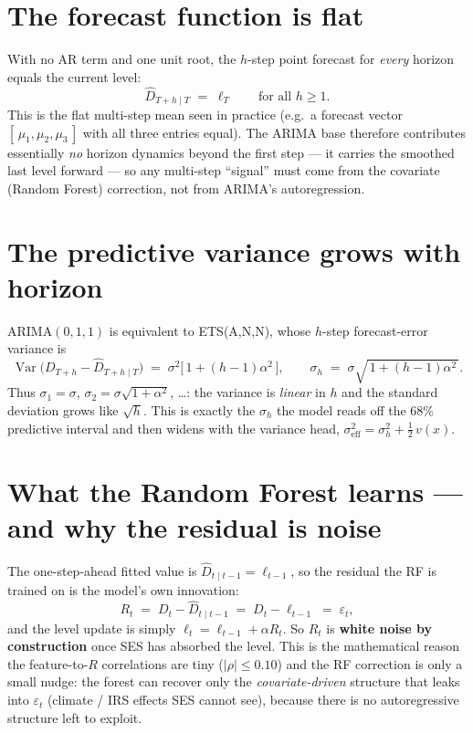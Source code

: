 \documentclass[11pt]{article}
\newcommand{\Var}{\operatorname{Var}}
\begin{document}
\section{The forecast function is flat}
With no AR term and one unit root, the $h$-step point forecast for \emph{every} horizon equals
the current level:
\begin{equation}
\hat D_{T+h\mid T} \;=\; \ell_T \qquad\text{for all } h\ge 1.
\label{eq:flat}
\end{equation}
This is the flat multi-step mean seen in practice (e.g.\ a forecast vector
$[\,\mu_1,\mu_2,\mu_3\,]$ with all three entries equal). The ARIMA base therefore contributes
essentially \emph{no} horizon dynamics beyond the first step --- it carries the smoothed last
level forward --- so any multi-step ``signal'' must come from the covariate (Random Forest)
correction, not from ARIMA's autoregression.

\section{The predictive variance grows with horizon}
ARIMA$(0,1,1)$ is equivalent to ETS(A,N,N), whose $h$-step forecast-error variance is
\begin{equation}
\Var\!\big(D_{T+h}-\hat D_{T+h\mid T}\big) \;=\; \sigma^2\big[\,1+(h-1)\alpha^2\,\big],
\qquad
\sigma_h \;=\; \sigma\sqrt{\,1+(h-1)\alpha^2\,}.
\label{eq:var}
\end{equation}
Thus $\sigma_1=\sigma$, $\sigma_2=\sigma\sqrt{1+\alpha^2}$, \dots: the variance is \emph{linear}
in $h$ and the standard deviation grows like $\sqrt{h}$. This is exactly the $\sigma_h$ the
model reads off the $68\%$ predictive interval and then widens with the variance head,
$\sigma_{\text{eff}}^2=\sigma_h^2+\tfrac12\,v(x)$.

\section{What the Random Forest learns --- and why the residual is noise}
The one-step-ahead fitted value is $\hat D_{t\mid t-1}=\ell_{t-1}$, so the residual the RF is
trained on is the model's own innovation:
\begin{equation}
R_t \;=\; D_t-\hat D_{t\mid t-1} \;=\; D_t-\ell_{t-1} \;=\; \varepsilon_t,
\label{eq:resid}
\end{equation}
and the level update is simply $\ell_t=\ell_{t-1}+\alpha R_t$. So $R_t$ is \textbf{white noise by
construction} once SES has absorbed the level. This is the mathematical reason the
feature-to-$R$ correlations are tiny ($\lvert\rho\rvert\le0.10$) and the RF correction is only a
small nudge: the forest can recover only the \emph{covariate-driven} structure that leaks into
$\varepsilon_t$ (climate / IRS effects SES cannot see), because there is no autoregressive
structure left to exploit.
\end{document}
